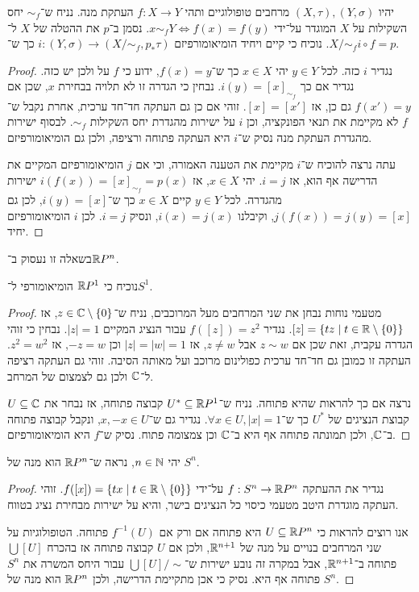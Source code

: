 \question{}
יהיו $(X, \tau), (Y, \sigma)$ מרחבים טופולוגיים ותהי $f : X \to Y$ העתקת מנה.
נניח ש־$\sim_f$ יחס השקילות על $X$ המוגדר על־ידי $x \sim_f Y \iff f(x) = f(y)$.
נסמן ב־$p$ את ההטלה של $X$ ל־$X / \sim_f$.
נוכיח כי קיים ויחיד הומיאומורפיזם $i : (Y, \sigma) \to (X / \sim_f, p_* \tau)$ כך ש־$i \circ f = p$.
\begin{proof}
	נגדיר $i$ כזה.
	לכל $y \in Y$ יהי $x \in X$ כך ש־$f(x) = y$, ידוע כי $f$ על ולכן יש כזה.
	נגדיר אם כך $i(y) = {[x]}_{\sim_f}$.
	נבחין כי הגדרה זו לא תלויה בבחירת $x$, שכן אם $f(x') = y$ גם כן, אז $[x] = [x']$.
	זוהי אם כן גם העתקה חד־חד ערכית, אחרת נקבל ש־$f$ לא מקיימת את תנאי הפונקציה, וכן $i$ על ישירות מהגדרת יחס השקילות $\sim_f$.
	לבסוף ישירות מהגדרת העתקת מנה נסיק ש־$i$ היא העתקה פתוחה ורציפה, ולכן גם הומיאומורפיזם.

	עתה נרצה להוכיח ש־$i$ מקיימת את הטענה האמורה, וכי אם $j$ הומיאומורפיזם המקיים את הדרישה אף הוא, אז $i = j$.
	יהי $x \in X$, אז $i(f(x)) = {[x]}_{\sim_f} = p(x)$ ישירות מהגדרה.
	לכל $y \in Y$ קיים $x \in X$ כך ש־$i(y) = [x]$, לכן גם $j(f(x)) = j(y) = [x]$, וקיבלנו $i(x) = j(x)$, ונסיק $i = j$.
	לכן $i$ הומיאומורפיזם יחיד.
\end{proof}

\question{}
בשאלה זו נעסוק ב־$\mathbb{R} P^n$.

\subquestion{}
נוכיח כי $\mathbb{R} P^1$ הומיאומורפי ל־$S^1$.
\begin{proof}
	מטעמי נוחות נבחן את שני המרחבים מעל המרוכבים, נניח ש־$z \in \mathbb{C} \setminus \{0\}$, אז $[z] = \{ t z \mid t \in \mathbb{R} \setminus \{0\}\}$.
	נגדיר $f([z]) = z^2$ עבור הנציג המקיים $|z| = 1$. נבחין כי זוהי הגדרה עקבית, זאת שכן אם $z \sim w$ אבל $z \ne w$, אז $|z| = |w| = 1$ וכן $-z = w$, אז $z^2 = w^2$.
	העתקה זו כמובן גם חד־חד ערכית כפולינום מרוכב ועל מאותה הסיבה.
	זוהי גם העתקה רציפה ל־$\mathbb{C}$ ולכן גם לצמצום של המרחב.

	נרצה אם כך להראות שהיא פתוחה.
	נניח ש־$U^* \subseteq \mathbb{R} P^1$ קבוצה פתוחה, אז נבחר את $U \subseteq \mathbb{C}$ קבוצת הנציגים של $U^*$ כך ש־$\forall x \in U, |x| = 1$.
	נגדיר גם ש־$x, -x \in U$, ונקבל קבוצה פתוחה ב־$\mathbb{C}$, ולכן תמונתה פתוחה אף היא ב־$\mathbb{C}$ וכן צמצומה פתוח.
	נסיק ש־$f$ היא הומיאומורפיזם.
\end{proof}

\subquestion{}
יהי $n \in \mathbb{N}$, נראה ש־$\mathbb{R} P^n$ הוא מנה של $S^n$.
\begin{proof}
	נגדיר את ההעתקה $f : S^n \to \mathbb{R} P^n$ על־ידי $f([x]) = \{ t x \mid t \in \mathbb{R} \setminus \{0\}\}$.
	זוהי העתקה מוגדרת היטב מטעמי כיסוי כל הנציגים בישר, והיא על ישירות מבחירת נציג בטווח.

	אנו רוצים להראות כי $U \subseteq \mathbb{R} P^n$ היא פתוחה אם ורק אם $f^{-1}(U)$ פתוחה.
	הטופולוגיות על שני המרחבים בנויים על מנה של $\mathbb{R}^{n + 1}$, ולכן אם $U$ קבוצה פתוחה אז בהכרח $\bigcup [U]$ פתוחה ב־$\mathbb{R}^{n + 1}$, אבל במקרה זה נובע ישירות ש־$\bigcup [U] / \sim$ עבור היחס המשרה את $S^n$ פתוחה אף היא.
	נסיק כי אכן מתקיימת הדרישה, ולכן $\mathbb{R} P^n$ הוא מנה של $S^n$.
\end{proof}


